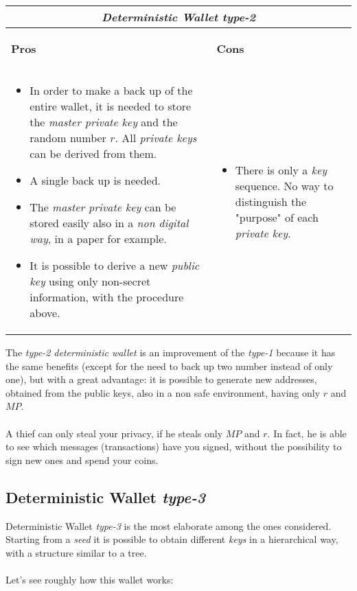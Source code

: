 \begin{center}
	\begin{tabular}{ |p{6cm}|p{6cm}|  }
		\hline
		\multicolumn{2}{|c|}{\textbf{\textit{Deterministic Wallet type-2}}} \\
		\hline \hline 
		\begin{center}
			\textbf{Pros}
		\end{center}&\begin{center}
			\textbf{Cons}
		\end{center}\\
		\hline
		\begin{itemize}
			\item In order to make a back up of the entire wallet, it is needed to store the \textit{master private key} and the random number $r$. All \textit{private keys} can be derived from them.
			\item A single back up is needed.
			\item The \textit{master private key} can be stored easily also in a \textit{non digital way}, in a paper for example.
			\item It is possible to derive a new \textit{public key} using only non-secret information, with the procedure above.
		\end{itemize} &
		\begin{itemize}
			\item There is only a \textit{key} sequence. No way to distinguish the "purpose" of each \textit{private key}.
		\end{itemize}\\
		\hline
	\end{tabular}
\end{center}
The \textit{type-2 deterministic wallet} is an improvement of the \textit{type-1} because it has the same benefits (except for the need to back up two number instead of only one), but with a great advantage: it is possible to generate new addresses, obtained from the public keys, also in a non safe environment, having only $r$ and $MP$. 
\\ \\
A thief can only steal your privacy, if he steals only $MP$ and $r$. In fact, he is able to see which messages (transactions) have you signed, without the possibility to sign new ones and spend your coins.

\subsection{Deterministic Wallet \textit{type-3}}
Deterministic Wallet \textit{type-3} is the most elaborate among the ones considered. Starting from a \textit{seed} it is possible to obtain different \textit{keys} in a hierarchical way, with a structure similar to a tree. 
\\ \\
Let's see roughly how this wallet works:

